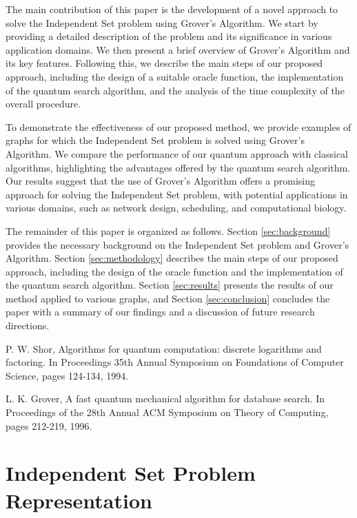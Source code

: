 The main contribution of this paper is the development of a novel approach to solve the Independent Set problem using Grover's Algorithm. We start by providing a detailed description of the problem and its significance in various application domains. We then present a brief overview of Grover's Algorithm and its key features. Following this, we describe the main steps of our proposed approach, including the design of a suitable oracle function, the implementation of the quantum search algorithm, and the analysis of the time complexity of the overall procedure.

To demonstrate the effectiveness of our proposed method, we provide examples of graphs for which the Independent Set problem is solved using Grover's Algorithm. We compare the performance of our quantum approach with classical algorithms, highlighting the advantages offered by the quantum search algorithm. Our results suggest that the use of Grover's Algorithm offers a promising approach for solving the Independent Set problem, with potential applications in various domains, such as network design, scheduling, and computational biology.

The remainder of this paper is organized as follows. Section \ref{sec:background} provides the necessary background on the Independent Set problem and Grover's Algorithm. Section \ref{sec:methodology} describes the main steps of our proposed approach, including the design of the oracle function and the implementation of the quantum search algorithm. Section \ref{sec:results} presents the results of our method applied to various graphs, and Section \ref{sec:conclusion} concludes the paper with a summary of our findings and a discussion of future research directions.

\begin{thebibliography}{9}
P. W. Shor, Algorithms for quantum computation: discrete logarithms and factoring. In Proceedings 35th Annual Symposium on Foundations of Computer Science, pages 124-134, 1994.

L. K. Grover, A fast quantum mechanical algorithm for database search. In Proceedings of the 28th Annual ACM Symposium on Theory of Computing, pages 212-219, 1996.
\end{thebibliography}

\section{Independent Set Problem Representation}

